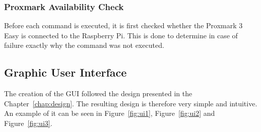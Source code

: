\subsubsection{Proxmark Availability Check}

Before each command is executed, it is first checked whether the Proxmark 3 Easy is connected to the Raspberry Pi. This is done to determine in case of failure exactly why the command was not executed.

\subsection{Graphic User Interface}

The creation of the GUI followed the design presented in the Chapter~\ref{chap:design}. The resulting design is therefore very simple and intuitive. An example of it can be seen in Figure~\ref{fig:ui1}, Figure~\ref{fig:ui2} and Figure~\ref{fig:ui3}.

